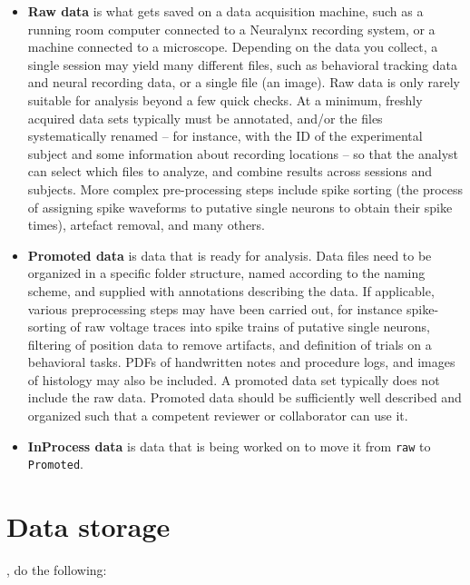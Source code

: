\documentclass{tufte-book}
\newcommand{\doccls}[1]{\texttt{#1}}%
\begin{document}
\begin{itemize}

\item{{\bf Raw data} is what gets saved on a data acquisition machine,
  such as a running room computer connected to a Neuralynx recording
  system, or a machine connected to a microscope. Depending on the
  data you collect, a single session may yield many different files,
  such as behavioral tracking data and neural recording data, or a
  single file (an image). Raw data is only rarely suitable for
  analysis beyond a few quick checks. At a minimum, freshly acquired
  data sets typically must be annotated, and/or the files
  systematically renamed -- for instance, with the ID of the
  experimental subject and some information about recording locations
  -- so that the analyst can select which files to analyze, and combine
  results across sessions and subjects. More complex pre-processing
  steps include spike sorting (the process of assigning spike
  waveforms to putative single neurons to obtain their spike times),
  artefact removal, and many others.}

\item{{\bf Promoted data} is data that is ready for analysis. Data
  files need to be organized in a specific folder structure, named
  according to the naming scheme, and supplied with annotations
  describing the data. If applicable, various preprocessing steps may
  have been carried out, for instance spike-sorting of raw voltage
  traces into spike trains of putative single neurons, filtering
  of position data to remove artifacts, and definition of trials on a
  behavioral tasks. PDFs of handwritten notes and procedure logs, and
  images of histology may also be included. A promoted data set
  typically does not include the raw data. Promoted data should be
  sufficiently well described and organized such that a competent
  reviewer or collaborator can use it.}

\item{{\bf InProcess data} is data that is being worked on to move it
  from \doccls{raw} to \doccls{Promoted}.}

\end{itemize}

\section{Data storage}

, do the
following:
\end{document}
